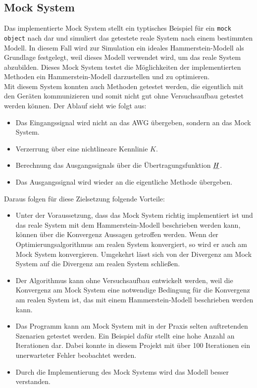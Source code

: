 \documentclass[../Report.tex]{subfiles}
\begin{document}
\subsection{Mock System}
\label{subsec:code.mock}
Das implementierte Mock System stellt ein typtisches Beispiel für ein \lstinline{mock object} nach \cite{mock} dar und simuliert das getestete reale System nach einem bestimmten Modell. In diesem Fall wird zur Simulation ein ideales Hammerstein-Modell als Grundlage festgelegt, weil dieses Modell verwendet wird, um das reale System abzubilden. Dieses Mock System testet die Möglichkeiten der implementierten Methoden ein Hammerstein-Modell darzustellen und zu optimieren.\\
Mit diesem System konnten auch Methoden getestet werden, die eigentlich mit den Geräten kommunizieren und somit nicht gut ohne Versuchsaufbau getestet werden können. Der Ablauf sieht wie folgt aus:
\begin{itemize}
	\item Das Eingangssignal wird nicht an das AWG übergeben, sondern an das Mock System.
	\item Verzerrung über eine nichtlineare Kennlinie $K$.
	\item Berechnung das Ausgangssignals über die Übertragungsfunktion $\underline{H}$.
	\item Das Ausgangssignal wird wieder an die eigentliche Methode übergeben.
\end{itemize}
Daraus folgen für diese Zielsetzung folgende Vorteile:
\begin{itemize}
	\item Unter der Voraussetzung, dass das Mock System richtig implementiert ist und das reale System mit dem Hammerstein-Modell beschrieben werden kann, können über die Konvergenz Aussagen getroffen werden. Wenn der Optimierungsalgorithmus am realen System konvergiert, so wird er auch am Mock System konvergieren. Umgekehrt lässt sich von der Divergenz am Mock System auf die Divergenz am realen System schließen.
	\item Der Algorithmus kann ohne Versuchsaufbau entwickelt werden, weil die Konvergenz am Mock System eine notwendige Bedingung für die Konvergenz am realen System ist, das mit einem Hammerstein-Modell beschrieben werden kann.
	\item Das Programm kann am Mock System mit in der Praxis selten auftretenden Szenarien getestet werden. Ein Beispiel dafür stellt eine hohe Anzahl an Iterationen dar. Dabei konnte in diesem Projekt mit über 100 Iterationen ein unerwarteter Fehler beobachtet werden.
	\item Durch die Implementierung des Mock Systems wird das Modell besser verstanden.
\end{itemize}
\end{document}
